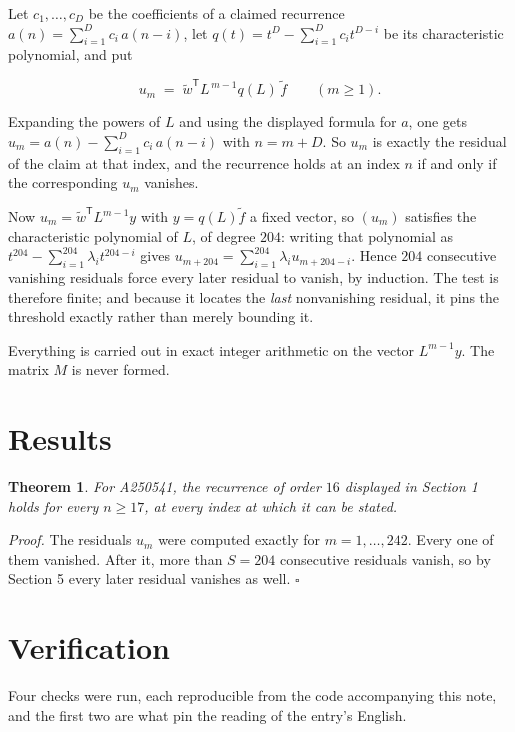 \documentclass[11pt]{article}
\newtheorem{theorem}{Theorem}
\theoremstyle{definition}
\begin{document}
Let $c_1,\dots,c_D$ be the coefficients of a claimed recurrence $a(n) = \sum_{i=1}^{D} c_i\,a(n-i)$, let $q(t) = t^{D} - \sum_{i=1}^{D} c_i t^{D-i}$ be its characteristic polynomial, and put

\[u_m \;=\; \tilde w^{\mathsf T} L^{\,m-1} q(L)\,\tilde f \qquad (m \ge 1).\]

Expanding the powers of $L$ and using the displayed formula for $a$, one gets $u_m = a(n) - \sum_{i=1}^{D} c_i\,a(n-i)$ with $n = m + D$. So $u_m$ is exactly the residual of the claim at that index, and the recurrence holds at an index $n$ if and only if the corresponding $u_m$ vanishes.

Now $u_m = \tilde w^{\mathsf T} L^{m-1} y$ with $y = q(L)\tilde f$ a fixed vector, so $(u_m)$ satisfies the characteristic polynomial of $L$, of degree $204$: writing that polynomial as $t^{204} - \sum_{i=1}^{204} \lambda_i t^{204-i}$ gives $u_{m+204} = \sum_{i=1}^{204} \lambda_i u_{m+204-i}$. Hence $204$ consecutive vanishing residuals force every later residual to vanish, by induction. The test is therefore finite; and because it locates the {\itshape last} nonvanishing residual, it pins the threshold exactly rather than merely bounding it.

Everything is carried out in exact integer arithmetic on the vector $L^{m-1}y$. The matrix $M$ is never formed.

\section{Results}

\begin{theorem} For A250541, the recurrence of order $16$ displayed in Section 1 holds for every $n \ge 17$, at every index at which it can be stated.\end{theorem}

{\itshape Proof.} The residuals $u_m$ were computed exactly for $m = 1,\dots,242$. Every one of them vanished. After it, more than $S = 204$ consecutive residuals vanish, so by Section 5 every later residual vanishes as well. $\square$

\section{Verification}

Four checks were run, each reproducible from the code accompanying this note, and the first two are what pin the reading of the entry's English.
\end{document}
